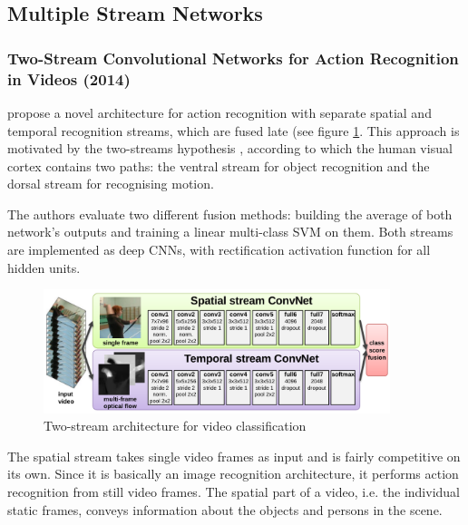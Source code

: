 \newpage
\subsection{Multiple Stream Networks}


\subsubsection{Two-Stream Convolutional Networks for Action Recognition in Videos (2014)}

\textcite{simonyan_two-stream_2014} propose a novel architecture for action recognition with separate spatial and temporal recognition streams, which are fused late (see figure \ref{fig:twostream_architecture}.
This approach is motivated by the two-streams hypothesis \cite{goodale_separate_1992}, according to which the human visual cortex contains two paths: the ventral stream for object recognition and the dorsal stream for recognising motion.

The authors evaluate two different fusion methods: building the average of both network's outputs and training a linear multi-class SVM on them.
Both streams are implemented as deep CNNs, with rectification activation function for all hidden units.

\begin{figure}[H]
    \centering
    \includegraphics[width=0.9\textwidth]{img_deep/twostream_architecture}
    \caption{Two-stream architecture for video classification \cite{simonyan_two-stream_2014}}
    \label{fig:twostream_architecture}
\end{figure}

The spatial stream takes single video frames as input and is fairly competitive on its own.
Since it is basically an image recognition architecture, it performs action recognition from still video frames.
The spatial part of a video, i.e. the individual static frames, conveys information about the objects and persons in the scene.

